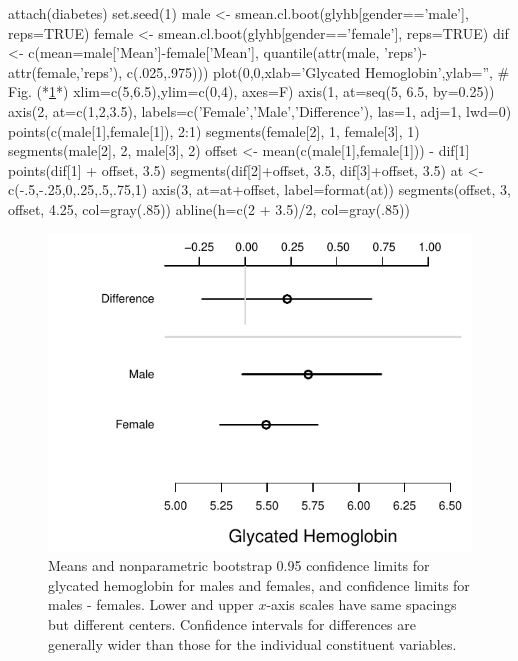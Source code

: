 \begin{Schunk}
\begin{Sinput}
attach(diabetes)
set.seed(1)
male   <- smean.cl.boot(glyhb[gender=='male'],   reps=TRUE)
female <- smean.cl.boot(glyhb[gender=='female'], reps=TRUE)
dif <- c(mean=male['Mean']-female['Mean'],
         quantile(attr(male, 'reps')-attr(female,'reps'), c(.025,.975)))
plot(0,0,xlab='Glycated Hemoglobin',ylab='',   # Fig. (*\ref{fig:descript-cldif}*)
     xlim=c(5,6.5),ylim=c(0,4), axes=F)
axis(1, at=seq(5, 6.5, by=0.25))
axis(2, at=c(1,2,3.5), labels=c('Female','Male','Difference'),
     las=1, adj=1, lwd=0)
points(c(male[1],female[1]), 2:1)
segments(female[2], 1, female[3], 1)
segments(male[2], 2,   male[3], 2)
offset <- mean(c(male[1],female[1])) - dif[1]
points(dif[1] + offset, 3.5)
segments(dif[2]+offset, 3.5, dif[3]+offset, 3.5)
at <- c(-.5,-.25,0,.25,.5,.75,1)
axis(3, at=at+offset, label=format(at))
segments(offset, 3, offset, 4.25, col=gray(.85))
abline(h=c(2 + 3.5)/2, col=gray(.85))
\end{Sinput}
\begin{figure}[htbp]

\centerline{\includegraphics{descript-cldif-1} }

\caption[Showing group means and differences]{Means and nonparametric bootstrap 0.95 confidence limits for glycated hemoglobin for males and females, and confidence limits for males - females.  Lower and upper $x$-axis scales have same spacings but different centers.  Confidence intervals for differences are generally wider than those for the individual constituent variables.}\label{fig:descript-cldif}
\end{figure}
\end{Schunk}
  
